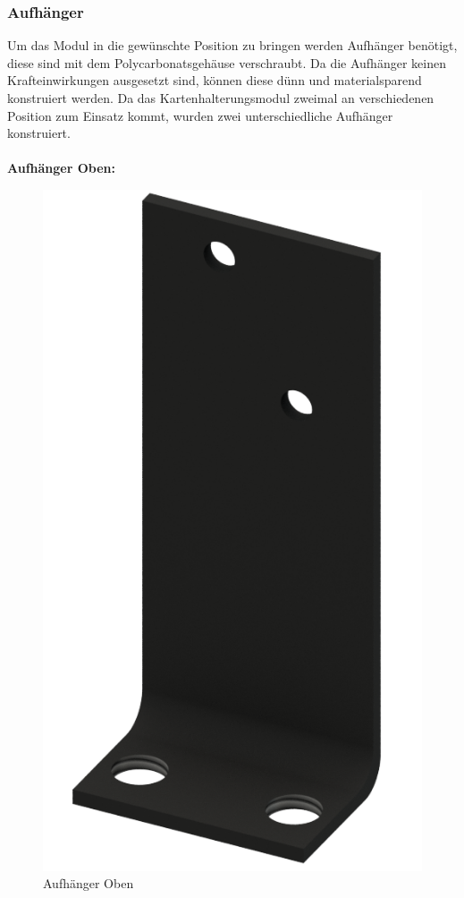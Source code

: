\subsubsection{Aufhänger}
Um das Modul in die gewünschte Position zu bringen werden Aufhänger benötigt, diese sind mit dem Polycarbonatsgehäuse verschraubt.
Da die Aufhänger keinen Krafteinwirkungen ausgesetzt sind, können diese dünn und materialsparend konstruiert werden.
Da das Kartenhalterungsmodul zweimal an verschiedenen Position zum Einsatz kommt, wurden zwei unterschiedliche
Aufhänger konstruiert.\\\\
\textbf{Aufhänger Oben:} \\
\begin{figure}[H]
    \centering
    \includegraphics[scale = 0.2]{fig/mech/StopperObenKurz.png}
    \caption{Aufhänger Oben}
    \label{fig:Aufhänger Oben}
\end{figure}
